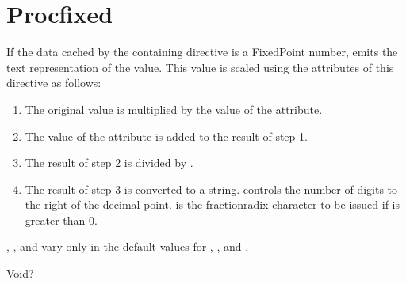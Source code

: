 \documentclass[letterpaper,12pt,english,openany,oneside]{sphinxmanual}
\begin{document}
\section{Proc\sphinxhyphen{}fixed}
\label{\detokenize{SaveAsXML_DirectivesRef:proc-fixed}}
If the data cached by the containing  directive is a FixedPoint number, emits the text representation of the value. This value is scaled using the attributes of this directive as follows:
\begin{enumerate}
%
\item {} 
The original value is multiplied by the value of the  attribute.

\item {} 
The value of the  attribute is added to the result of step 1.

\item {} 
The result of step 2 is divided by .

\item {} 
The result of step 3 is converted to a string.  controls the number of digits to the right of the decimal point.  is the fraction\sphinxhyphen{}radix character to be issued if  is greater than 0.

\end{enumerate}

, , and  vary only in the default values for , , and .

\label{\detokenize{SaveAsXML_DirectivesRef:dtd-content-rule-16}}

\begin{sphinxVerbatim}[commandchars=\\\{\}]
Void?
\end{sphinxVerbatim}
\label{\detokenize{SaveAsXML_DirectivesRef:attributes-14}}
\end{document}
